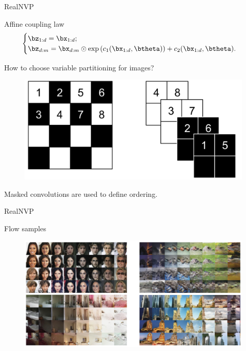 \begin{frame}{RealNVP}
	\begin{block}{Affine coupling law}
		\[
		\begin{cases} \bz_{1:d} = \bx_{1:d}; \\ \bz_{d:m} = \bx_{d:m} \odot \exp \left(c_1(\bx_{1:d}, \btheta)\right) + c_2(\bx_{1:d}, \btheta).\end{cases} 
		\]
	\end{block}
	How to choose variable partitioning for images?
	\begin{figure}
		\centering
		\includegraphics[width=0.75\linewidth]{figs/realnvp_masking.png}
	\end{figure}
	Masked convolutions are used to define ordering.
	
\end{frame}
\begin{frame}{RealNVP}
	\begin{block}{Flow samples}
		\begin{figure}
			\centering
			\includegraphics[width=\linewidth]{figs/realnvp_output.png}
		\end{figure}
	\end{block}
\end{frame}

